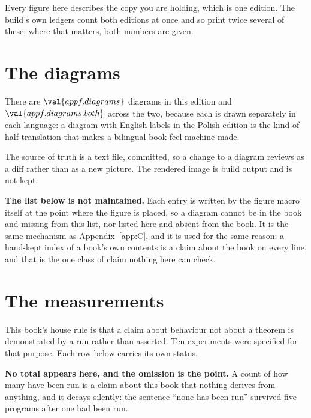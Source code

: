 \medskip
\begin{note}
Every figure here describes the copy you are holding, which is one edition.
The build's own ledgers count both editions at once and so print twice several
of these; where that matters, both numbers are given.
\end{note}

\section{The diagrams}
\label{sec:F-diagrams}

There are $\val{appf.diagrams}$ diagrams in this edition and
$\val{appf.diagrams.both}$ across the two, because each is drawn separately in
each language: a diagram with English labels in the Polish edition is the kind
of half-translation that makes a bilingual book feel machine-made.

The source of truth is a text file, committed, so a change to a diagram
reviews as a diff rather than as a new picture. The rendered image is build
output and is not kept.

\textbf{The list below is not maintained.} Each entry is written by the figure macro
itself at the point where the figure is placed, so a diagram cannot be in the
book and missing from this list, nor listed here and absent from the book. It
is the same mechanism as Appendix~\ref{app:C}, and it is used for the same
reason: a hand-kept index of a book's own contents is a claim about the book on
every line, and that is the one class of claim nothing here can check.

\listofdiagrams

\section{The measurements}
\label{sec:F-measurements}

This book's house rule is that a claim about behaviour \dash{} not about a
theorem \dash{} is demonstrated by a run rather than asserted. Ten experiments
were specified for that purpose. Each row below carries its own status.

\textbf{No total appears here, and the omission is the point.} A count of how
many have been run is a claim about this book that nothing derives from
anything, and it decays silently: the sentence \enquote{none has been run}
survived five programs after one had been run.

